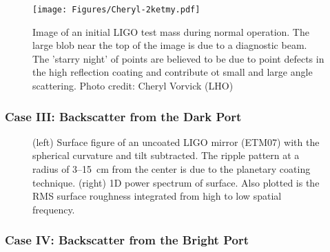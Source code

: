 \begin{figure}[h]
  \centering
    \texttt{[image: Figures/Cheryl-2ketmy.pdf]}
    \caption{Image of an initial LIGO test mass during normal operation. The large blob near the top of the image is due to a diagnostic beam. The 'starry night' of points are believed to be due to point defects in the high reflection coating and contribute ot small and large angle scattering. Photo credit: Cheryl Vorvick (LHO)}
    \label{fig:2kETMy}
\end{figure}




\subsubsection{Case III: Backscatter from the Dark Port}

\begin{figure}
    \centering
    \qquad
    \caption{(left) Surface figure of an uncoated LIGO mirror (ETM07) with the
      spherical curvature and tilt subtracted. The ripple pattern at a radius
      of 3--15~cm from the center is due to the planetary coating technique.
      (right) 1D power spectrum of surface. Also
      plotted is the RMS surface roughness integrated from high to low
      spatial frequency.}
    \label{fig:PhaseMap}
\end{figure}

\subsubsection{Case IV: Backscatter from the Bright Port}




